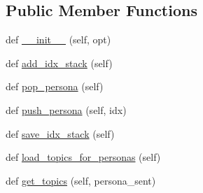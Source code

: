 \subsection*{Public Member Functions}
\begin{DoxyCompactItemize}
\item 
def \hyperlink{classparlai_1_1mturk_1_1tasks_1_1wizard__of__wikipedia_1_1worlds_1_1PersonasGenerator_a69ae53c0b17ddd4a5a2f4008382c4963}{\+\_\+\+\_\+init\+\_\+\+\_\+} (self, opt)
\item 
def \hyperlink{classparlai_1_1mturk_1_1tasks_1_1wizard__of__wikipedia_1_1worlds_1_1PersonasGenerator_ad3d5897169d157dbb05ef1ad70b857f4}{add\+\_\+idx\+\_\+stack} (self)
\item 
def \hyperlink{classparlai_1_1mturk_1_1tasks_1_1wizard__of__wikipedia_1_1worlds_1_1PersonasGenerator_a587c095d1aa21abacac238160ead6dd0}{pop\+\_\+persona} (self)
\item 
def \hyperlink{classparlai_1_1mturk_1_1tasks_1_1wizard__of__wikipedia_1_1worlds_1_1PersonasGenerator_a0d02d0a14ad598f69e3d1795bb27c57b}{push\+\_\+persona} (self, idx)
\item 
def \hyperlink{classparlai_1_1mturk_1_1tasks_1_1wizard__of__wikipedia_1_1worlds_1_1PersonasGenerator_a0ee9cbb0babee20a81021f18be91b88d}{save\+\_\+idx\+\_\+stack} (self)
\item 
def \hyperlink{classparlai_1_1mturk_1_1tasks_1_1wizard__of__wikipedia_1_1worlds_1_1PersonasGenerator_a3fcb297679661fe3955ea3aa416f32c4}{load\+\_\+topics\+\_\+for\+\_\+personas} (self)
\item 
def \hyperlink{classparlai_1_1mturk_1_1tasks_1_1wizard__of__wikipedia_1_1worlds_1_1PersonasGenerator_aba181bd2c15a09c9ad2cf3eec960f483}{get\+\_\+topics} (self, persona\+\_\+sent)
\end{DoxyCompactItemize}
